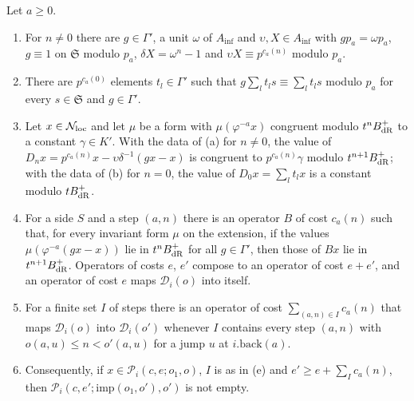 \begin{lemma}\label{lem:depth-step}
Let $a\ge0$.
\begin{enumerate}[label=\textup{(\alph*)}]
\item For $n\ne0$ there are $g\in\Gamma'$, a unit $\omega$ of $A_{\inf}$ and $\upsilon,X\in A_{\inf}$ with $gp_a=\omega p_a$, $g\equiv1$ on $\mathfrak S$ modulo $p_a$, $\delta X=\omega^n-1$ and $\upsilon X\equiv p^{c_a(n)}$ modulo $p_a$.
\item There are $p^{c_a(0)}$ elements $t_l\in\Gamma'$ such that $g\sum_lt_ls\equiv\sum_lt_ls$ modulo $p_a$ for every $s\in\mathfrak S$ and $g\in\Gamma'$.
\item Let $x\in\mathcal N_{\rm loc}$ and let $\mu$ be a form with $\mu(\varphi^{-a}x)$ congruent modulo $t^nB_{\rm dR}^+$ to a constant $\gamma\in K'$. With the data of (a) for $n\ne0$, the value of $D_nx=p^{c_a(n)}x-\upsilon\delta^{-1}(gx-x)$ is congruent to $p^{c_a(n)}\gamma$ modulo
$t^{n+1}B_{\rm dR}^+$; with the data of (b) for $n=0$, the value of $D_0x=\sum_lt_lx$ is a constant modulo $tB_{\rm dR}^+$.
\item For a side $S$ and a step $(a,n)$ there is an operator $B$ of cost $c_a(n)$ such that, for every invariant form $\mu$ on the extension, if the values $\mu(\varphi^{-a}(gx-x))$ lie in $t^nB_{\rm dR}^+$ for all $g\in\Gamma'$, then those of $Bx$ lie in $t^{n+1}B_{\rm dR}^+$.
Operators of costs $e$, $e'$ compose to an operator of cost $e+e'$, and an operator of cost $e$ maps $\mathcal D_i(o)$ into itself.
\item For a finite set $I$ of steps there is an operator of cost $\sum_{(a,n)\in I}c_a(n)$ that maps $\mathcal D_i(o)$ into $\mathcal D_i(o')$ whenever $I$ contains every step $(a,n)$ with $o(a,u)\le n<o'(a,u)$ for a jump $u$ at $i.\mathrm{back}(a)$.
\item Consequently, if $x\in\mathcal P_i(c,e;o_1,o)$, $I$ is as in (e) and $e'\ge e+\sum_Ic_a(n)$, then $\mathcal P_i(c,e';\mathrm{imp}(o_1,o'),o')$ is not empty.
\end{enumerate}
\end{lemma}

